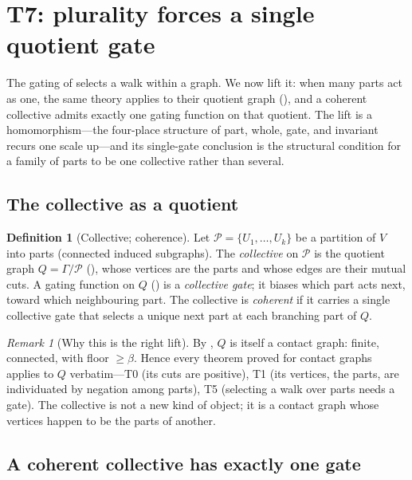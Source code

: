 \documentclass[11pt,a4paper]{article}
\theoremstyle{thmstyle}
\theoremstyle{definition}
\newtheorem{definition}[theorem]{Definition}
\theoremstyle{remark}
\newtheorem{remark}[theorem]{Remark}
\newcommand{\Gph}{\Gamma}                 %
\newcommand{\V}{V}                        %
\newcommand{\floorc}{\beta}               %
\newcommand{\Quot}{Q}                     %
\begin{document}
\section{T7: plurality forces a single quotient gate}
\label{sec:quotient}

The gating of  selects a walk within a graph. We now lift it:
when many parts act as one, the same theory applies to their quotient graph
(), and a coherent collective admits exactly one gating
function on that quotient. The lift is a homomorphism---the four-place structure
of part, whole, gate, and invariant recurs one scale up---and its single-gate
conclusion is the structural condition for a family of parts to be one
collective rather than several.

\subsection{The collective as a quotient}

\begin{definition}[Collective; coherence]
\label{def:collective}
Let $\mathcal{P}=\{U_1,\dots,U_k\}$ be a partition of $\V$ into parts (connected
induced subgraphs). The \emph{collective} on $\mathcal{P}$ is the quotient graph
$\Quot=\Gph/\mathcal{P}$ (), whose vertices are the parts and
whose edges are their mutual cuts. A gating function on $\Quot$
() is a \emph{collective gate}; it biases which part acts next,
toward which neighbouring part. The collective is \emph{coherent} if it carries a
single collective gate that selects a unique next part at each branching part of
$\Quot$.
\end{definition}

\begin{remark}[Why this is the right lift]
\label{rem:lift}
By , $\Quot$ is itself a contact graph: finite,
connected, with floor $\ge\floorc$. Hence every theorem proved for contact graphs
applies to $\Quot$ verbatim---T0 (its cuts are positive), T1 (its vertices, the
parts, are individuated by negation among parts), T5 (selecting a walk over parts
needs a gate). The collective is not a new kind of object; it is a contact graph
whose vertices happen to be the parts of another.
\end{remark}

\subsection{A coherent collective has exactly one gate}
\end{document}
